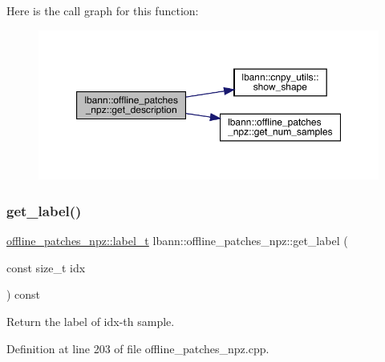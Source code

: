 Here is the call graph for this function\+:\nopagebreak
\begin{figure}[H]
\begin{center}
\leavevmode
\includegraphics[width=350pt]{classlbann_1_1offline__patches__npz_a9ffc5cc4b431a4ad18cd58651ca05ef8_cgraph}
\end{center}
\end{figure}
\mbox{\label{classlbann_1_1offline__patches__npz_a7548019f8e7f768027b50d497c4e6e73}} 
\subsubsection{\texorpdfstring{get\+\_\+label()}{get\_label()}}
{\footnotesize\ttfamily \hyperlink{classlbann_1_1offline__patches__npz_ae0ed6bf62b2be1814964206522ed4e05}{offline\+\_\+patches\+\_\+npz\+::label\+\_\+t} lbann\+::offline\+\_\+patches\+\_\+npz\+::get\+\_\+label (\begin{DoxyParamCaption}\item[{const size\+\_\+t}]{idx }\end{DoxyParamCaption}) const}



Return the label of idx-\/th sample. 



Definition at line 203 of file offline\+\_\+patches\+\_\+npz.\+cpp.


